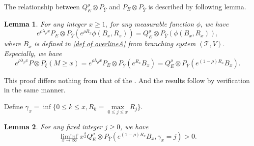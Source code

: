\documentclass[]{article}
\makeatletter
\numberwithin{equation}{section}
\renewenvironment{proof}[1][\proofname]{%
	\par\pushQED{\qed}\normalfont%
	\topsep6\p@\@plus6\p@\relax
	\trivlist\item[\hskip\labelsep\bfseries#1\@addpunct{.}]%
	\ignorespaces
}{%
	\popQED\endtrivlist\@endpefalse
}
\theoremstyle{thmstyleone}%
\theoremstyle{thmstyletwo}%
\theoremstyle{thmstylethree}%
\theoremstyle{thmstylefour}%
\newtheorem{lemma}{Lemma}
\theoremstyle{thmstylefive}%
\theoremstyle{thmstylesix}%
\makeatother
\begin{document}
	
	The relationship between $Q^\rho_E\otimes P_{\overline{Y}}$ and $P_E\otimes P_{\overline{Y}}$ is described by following lemma.
	\begin{lemma}\label{Measure change Relationship 2}
		For any integer $x\geqslant 1$, for any measurable function $\phi$, we have
		\begin{equation}
			e^{\rho\lambda_\rho x}P_E\otimes P_{\overline{Y}} (e^{\rho R_x}\phi(B_x,R_x)) = Q^\rho_E\otimes P_{\overline{Y}} ( \phi(B_x,R_x) ),
		\end{equation}
		where $B_x$ is defined in \cref{def of overlineA} from branching system $(\mathcal{T},V)$.
		Especially, we have
		\begin{equation}
			e^{\rho\lambda_\rho x} P\otimes P_\xi(M\geqslant x)
			=
			e^{\rho\lambda_\rho x} P_E\otimes P_{\overline{Y}}(e^{R_x}B_x)
			=
			Q^\rho_E\otimes P_{\overline{Y}} (e^{(1-\rho)R_x}B_x).
		\end{equation}
	\end{lemma}
	
	
	\begin{proof}[Proof of \Cref{Measure change Relationship 2}]
		This proof differs nothing from that of the . And the results follow by verification in the same manner.
	\end{proof}
	
	Define $ \gamma_x = \inf\{0\leqslant k\leqslant x, R_k=\max\limits_{0\leqslant j\leqslant x} R_j\}$.
	
	\begin{lemma}\label{lemma of weakly 1}
		For any fixed integer $j\geqslant0$, we have
		\begin{equation}
			\liminf\limits_{x\rightarrow\infty} x^{\frac{3}{2}}
			Q_E^\rho\otimes P_{\overline{Y}}
			\left(e^{(1-\rho)R_x}B_x,\gamma_x=j\right) >0.
		\end{equation}
	\end{lemma}
	
\end{document}
